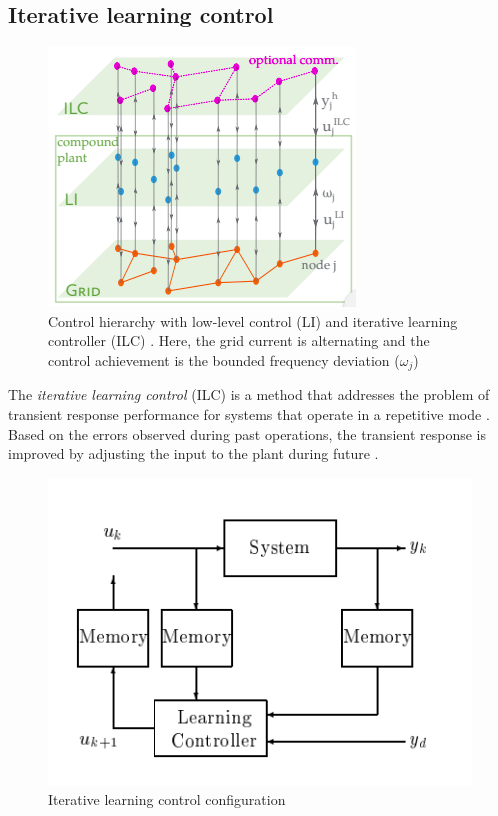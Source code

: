 \subsection{Iterative learning control}
\label{subsec:ilc}
\begin{figure}[h]
	\centering
	\includegraphics[scale=0.7]{pictures/control_hierarchy.png}
	\caption{Control hierarchy with low-level control (LI) and iterative learning controller (ILC) \cite{paperilc}. Here, the grid current is alternating and the control achievement is the bounded frequency deviation ($\omega_j$)}
	\label{fig:control_hier}
\end{figure}
The \textit{iterative learning control} (ILC) is a method that addresses the problem of transient response performance for systems that operate in a repetitive mode \cite{vl_ilc}. Based on the errors observed during past operations, the transient response is improved by adjusting the input to the plant during future \cite{vl_ilc}.
\begin{figure}[h]
\centering
    \includegraphics[scale=0.56]{pictures/ILC_schema.png}
    \caption{Iterative learning control configuration}
    \label{fig:figure_ILC}
\end{figure}
